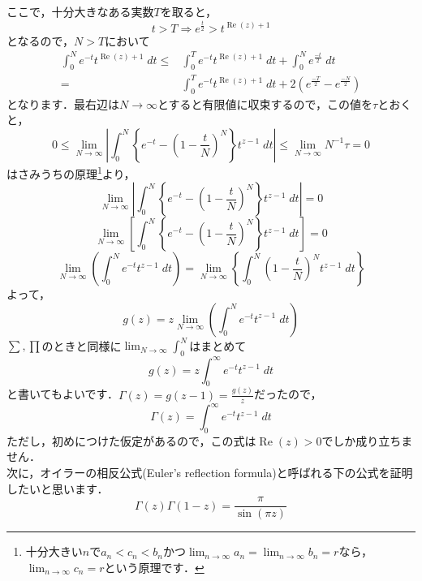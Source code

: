 \documentclass[./main]{subfile}
\begin{document}
ここで，十分大きなある実数$T$を取ると，
\[
t>T\Rightarrow e^{\frac{t}{2}}>t^{\operatorname{Re}(z)+1}
\]
となるので，$N>T$において
\begin{align*}
\int_0^Ne^{-t}t^{\operatorname{Re}(z)+1}\;dt\leq&\int_0^Te^{-t}t^{\operatorname{Re}(z)+1}\;dt+\int_0^Ne^{\frac{-t}{2}}\;dt\\
=&\int_0^Te^{-t}t^{\operatorname{Re}(z)+1}\;dt+2(e^{\frac{-T}{2}}-e^{\frac{-N}{2}})
\end{align*}
となります．最右辺は$N\to\infty$とすると有限値に収束するので，この値を$\tau$とおくと，
\[
0\leq\lim_{N\to\infty}\left|\int_0^N\left\{e^{-t}-\left(1-\frac{t}{N}\right)^N\right\}t^{z-1}\;dt\right|\leq\lim_{N\to\infty}N^{-1}\tau=0
\]
はさみうちの原理\footnote{十分大きい$n$で$a_n<c_n<b_n$かつ$\lim_{n\to\infty}a_n=\lim_{n\to\infty}b_n=r$なら，$\lim_{n\to\infty}c_n=r$という原理です．}より，
\[
\lim_{N\to\infty}\left|\int_0^N\left\{e^{-t}-\left(1-\frac{t}{N}\right)^N\right\}t^{z-1}\;dt\right|=0
\]
\[
\lim_{N\to\infty}\left[\int_0^N\left\{e^{-t}-\left(1-\frac{t}{N}\right)^N\right\}t^{z-1}\;dt\right]=0
\]
\[
\lim_{N\to\infty}\left(\int_0^Ne^{-t}t^{z-1}\;dt\right)=\lim_{N\to\infty}\left\{\int_0^N\left(1-\frac{t}{N}\right)^Nt^{z-1}\;dt\right\}
\]
よって，
\[
g(z)=z\lim_{N\to\infty}\left(\int_0^Ne^{-t}t^{z-1}\;dt\right)
\]
$\sum,\prod$のときと同様に$\lim_{N\to\infty}\int_0^N$はまとめて
\[
g(z)=z\int_0^{\infty}e^{-t}t^{z-1}\;dt
\]
と書いてもよいです．$\Gamma(z)=g(z-1)=\frac{g(z)}{z}$だったので，
\[
\Gamma(z)=\int_0^{\infty}e^{-t}t^{z-1}\;dt
\]
ただし，初めにつけた仮定があるので，この式は$\operatorname{Re}(z)>0$でしか成り立ちません．
\vspace{\baselineskip}\\

次に，オイラーの相反公式(Euler's reflection formula)と呼ばれる下の公式を証明したいと思います．
\begin{equation}\label{ERF}
\Gamma(z)\Gamma(1-z)=\frac{\pi}{\sin (\pi z)}
\end{equation}
\end{document}

